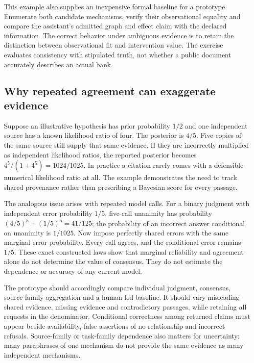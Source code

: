 This example also supplies an inexpensive formal baseline for a
prototype. Enumerate both candidate mechanisms, verify their
observational equality and compare the assistant's admitted graph and
effect claim with the declared information. The correct behavior under
ambiguous evidence is to retain the distinction between observational
fit and intervention value. The exercise evaluates consistency with
stipulated truth, not whether a public document accurately describes an
actual bank.

\hypertarget{why-repeated-agreement-can-exaggerate-evidence}{%
\subsection{Why repeated agreement can exaggerate
evidence}\label{why-repeated-agreement-can-exaggerate-evidence}}

Suppose an illustrative hypothesis has prior probability \(1/2\) and one
independent source has a known likelihood ratio of four. The posterior
is \(4/5\). Five copies of the same source still supply that same
evidence. If they are incorrectly multiplied as independent likelihood
ratios, the reported posterior becomes \(4^5/(1+4^5)=1024/1025\). In
practice a citation rarely comes with a defensible numerical likelihood
ratio at all. The example demonstrates the need to track shared
provenance rather than prescribing a Bayesian score for every passage.
\citep{exec14_expert_oracle}

The analogous issue arises with repeated model calls. For a binary
judgment with independent error probability \(1/5\), five-call unanimity
has probability \((4/5)^5+(1/5)^5=41/125\); the probability of an
incorrect answer conditional on unanimity is \(1/1025\). Now impose
perfectly shared errors with the same marginal error probability. Every
call agrees, and the conditional error remains \(1/5\). These exact
constructed laws show that marginal reliability and agreement alone do
not determine the value of consensus. They do not estimate the
dependence or accuracy of any current model.
\citep{exec14_expert_oracle}

The prototype should accordingly compare individual judgment, consensus,
source-family aggregation and a human-led baseline. It should vary
misleading shared evidence, missing evidence and contradictory passages,
while retaining all requests in the denominator. Conditional correctness
among returned claims must appear beside availability, false assertions
of no relationship and incorrect refusals. Source-family or task-family
dependence also matters for uncertainty: many paraphrases of one
mechanism do not provide the same evidence as many independent
mechanisms.

